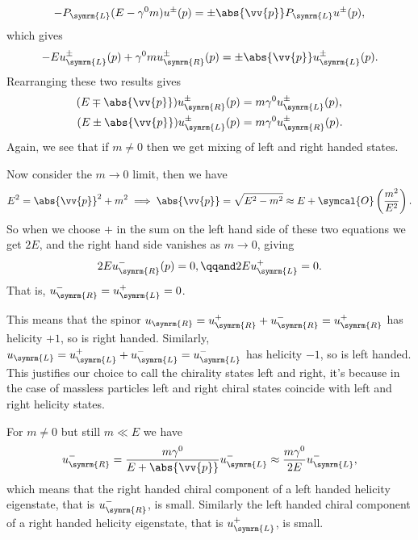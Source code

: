 \documentclass[fleqn]{NotesClass}
\newcommand{\order}{\symcal{O}}
\newcommand{\Left}{\symrm{L}}
\newcommand{\Right}{\symrm{R}}
\begin{document}
    \begin{equation}
        -P_{\Left}(E - \gamma^0m)u^{\pm}(p) = \pm\abs{\vv{p}}P_{\Left}u^{\pm}(p),
    \end{equation}
    which gives
    \begin{equation}
        -Eu^{\pm}_{\Left}(p) + \gamma^0mu^{\pm}_{\Right}(p) = \pm\abs{\vv{p}}u^{\pm}_{\Left}(p).
    \end{equation}
    Rearranging these two results gives
    \begin{align}
        (E \mp \abs{\vv{p}})u^{\pm}_{\Right}(p) &= m\gamma^0u^{\pm}_{\Left}(p),\\
        (E \pm \abs{\vv{p}})u^{\pm}_{\Left}(p) &= m\gamma^0u^{\pm}_{\Right}(p).
    \end{align}
    Again, we see that if \(m \ne 0\) then we get mixing of left and right handed states.
    
    Now consider the \(m \to 0\) limit, then we have
    \begin{equation}
        E^2 = \abs{\vv{p}}^2 + m^2 \implies \abs{\vv{p}} = \sqrt{E^2 - m^2} \approx E + \order\left( \frac{m^2}{E^2} \right).
    \end{equation}
    So when we choose \(+\) in the sum on the left hand side of these two equations we get \(2E\), and the right hand side vanishes as \(m \to 0\), giving
    \begin{equation}
        2Eu^{-}_{\Right}(p) = 0, \qqand 2Eu^{+}_{\Left} = 0.
    \end{equation}
    That is, \(u^{-}_{\Right} = u^{+}_{\Left} = 0\).
    
    This means that the spinor \(u_{\Right} = u^+_{\Right} + u^-_{\Right} = u^+_{\Right}\) has helicity \(+1\), so is right handed.
    Similarly, \(u_{\Left} = u^+_{\Left} + u^-_{\Left} = u^-_{\Left}\) has helicity \(-1\), so is left handed.
    This justifies our choice to call the chirality states left and right, it's because in the case of massless particles left and right chiral states coincide with left and right helicity states.
    
    For \(m \ne 0\) but still \(m \ll E\) we have
    \begin{equation}
        u^-_{\Right} = \frac{m\gamma^0}{E + \abs{\vv{p}}}u^-_{\Left} \approx \frac{m\gamma^0}{2E}u^-_{\Left},
    \end{equation}
    which means that the right handed chiral component of a left handed helicity eigenstate, that is \(u^-_{\Right}\), is small.
    Similarly the left handed chiral component of a right handed helicity eigenstate, that is \(u^+_{\Left}\), is small.
    
\end{document}
